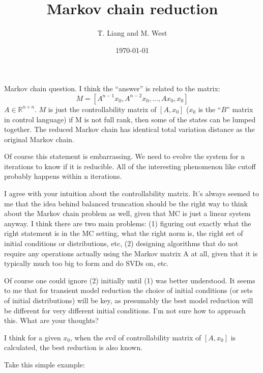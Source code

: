 \documentclass{article}
\title{Markov chain reduction}
\author{T. Liang and M. West}
\date{\today}
\begin{document}
\maketitle

Markov chain question. I think the ``answer'' is related to
the matrix:
\begin{equation}
M =  [ A^{n-1}x_0, A^{n-2}x_0, ... , Ax_0, x_0]    
\end{equation}
$A \in \mathbb{R}^{n\times n}$. $M$ is just the controllability matrix of $[A,x_0]$  ($x_0$ is the ``$B$''
matrix in control language)
if M is not full rank, then some of the states can be lumped together.
The reduced Markov chain has identical total variation distance as the
original Markov chain.

Of course this statement is embarrassing. We need to evolve the system
for n iterations to know if it is reducible. All of the interesting
phenomenon like cutoff probably happens within n iterations.


I agree with your intuition about the controllability matrix. It's always seemed to me that the idea behind balanced truncation should be the right way to think about the Markov chain problem as well, given that MC is just a linear system anyway. I think there are two main problems: (1) figuring out exactly what the right statement is in the MC setting, what the right norm is, the right set of initial conditions or distributions, etc, (2) designing algorithms that do not require any operations actually using the Markov matrix A at all, given that it is typically much too big to form and do SVDs on, etc.

Of course one could ignore (2) initially until (1) was better understood. It seems to me that for transient model reduction the choice of initial conditions (or sets of initial distributions) will be key, as presumably the best model reduction will be different for very different initial conditions. I'm not sure how to approach this. What are your thoughts?


I think for a given $x_0$, when the svd of controllability matrix of $[A,x_0]$ is calculated, the best reduction is also known.

Take this simple example: 
\end{document}
